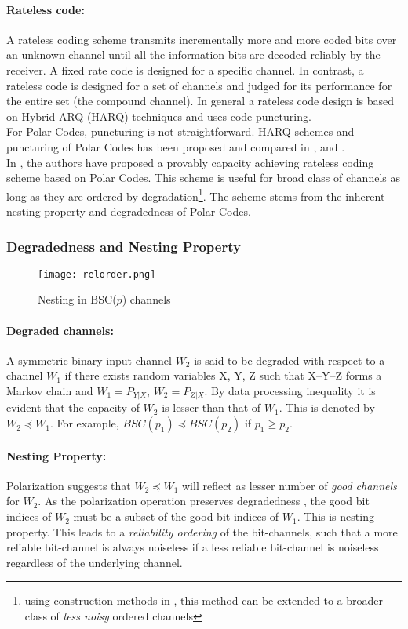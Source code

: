 \documentclass[
11pt, %
a4paper, %
oneside, %
headinclude,footinclude, %
BCOR5mm, %
]{scrartcl}
\begin{document}
\paragraph{Rateless code:}A rateless coding scheme transmits incrementally more and more coded bits over an unknown channel until all the information bits are decoded reliably by the receiver. A fixed rate code is designed for a specific channel. In contrast, a rateless code is designed for a set of channels and judged for its performance for the entire set (the compound channel). In general a rateless code design is based on Hybrid-ARQ (HARQ) techniques and uses code puncturing. \\For Polar Codes, puncturing is not straightforward. HARQ schemes and puncturing of Polar Codes has been proposed and compared in \cite{harqtav}, \cite{harqcheng} and \cite{harqchen}.\\ In \cite{chen}, the authors have proposed a provably capacity achieving rateless coding scheme based on Polar Codes. This scheme is useful for broad class of channels as long as they are ordered by degradation\footnote{using construction methods in \cite{wang}, \cite{mondelli} this method can be extended to a broader class of \emph{less noisy} ordered channels}. The scheme stems from the inherent nesting property and degradedness of Polar Codes.

\subsubsection{Degradedness and Nesting Property}
\begin{wrapfigure}{r}{0.5\textwidth}
  \begin{center}
    \texttt{[image: relorder.png]}
  \end{center}
  \caption{Nesting in BSC($p$) channels}
  \label{fig:relorder}
\end{wrapfigure}
\paragraph{Degraded channels:}A symmetric binary input channel $W_2$ is said to be degraded with respect to a channel $W_1$ if there exists random variables X, Y, Z such that X\---Y\---Z forms a Markov chain and $W_1=P_{Y|X}$, $W_2=P_{Z|X}$. By data processing inequality it is evident that the capacity of $W_2$ is lesser than that of $W_1$. This is denoted by $W_2 \preceq W_1$. For example, $BSC(p_1) \preceq BSC(p_2)$ if $p_1 \geq p_2$.
\paragraph{Nesting Property:}Polarization suggests that $W_2 \preceq W_1$ will reflect as lesser number of \emph{good channels} for $W_2$. As the polarization operation preserves degradedness \cite{wang}, the good bit indices of $W_2$ must be a subset of the good bit indices of $W_1$. This is nesting property. This leads to a \emph{reliability ordering} of the bit-channels, such that a more reliable bit-channel is always noiseless if a less reliable bit-channel is noiseless regardless of the underlying channel.
\end{document}
